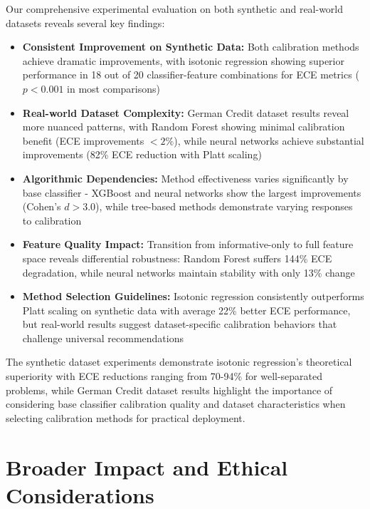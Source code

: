 \documentclass[12pt, a4paper]{article}
\begin{document}
Our comprehensive experimental evaluation on both synthetic and real-world datasets reveals several key findings:

\begin{itemize}
    \item \textbf{Consistent Improvement on Synthetic Data:} Both calibration methods achieve dramatic improvements, with isotonic regression showing superior performance in 18 out of 20 classifier-feature combinations for ECE metrics ($p < 0.001$ in most comparisons)

    \item \textbf{Real-world Dataset Complexity:} German Credit dataset results reveal more nuanced patterns, with Random Forest showing minimal calibration benefit (ECE improvements $< 2\%$), while neural networks achieve substantial improvements (82\% ECE reduction with Platt scaling)

    \item \textbf{Algorithmic Dependencies:} Method effectiveness varies significantly by base classifier - XGBoost and neural networks show the largest improvements (Cohen's $d > 3.0$), while tree-based methods demonstrate varying responses to calibration

    \item \textbf{Feature Quality Impact:} Transition from informative-only to full feature space reveals differential robustness: Random Forest suffers 144\% ECE degradation, while neural networks maintain stability with only 13\% change
    
    \item \textbf{Method Selection Guidelines:} Isotonic regression consistently outperforms Platt scaling on synthetic data with average 22\% better ECE performance, but real-world results suggest dataset-specific calibration behaviors that challenge universal recommendations
\end{itemize}

The synthetic dataset experiments demonstrate isotonic regression's theoretical superiority with ECE reductions ranging from 70-94\% for well-separated problems, while German Credit dataset results highlight the importance of considering base classifier calibration quality and dataset characteristics when selecting calibration methods for practical deployment.


\section{Broader Impact and Ethical Considerations}\label{sec:BroaderImpact}
\end{document}
